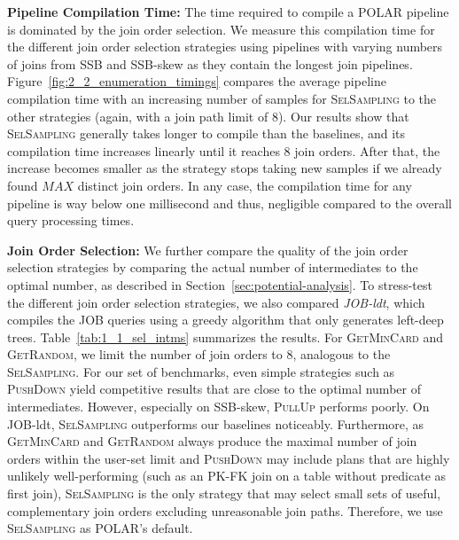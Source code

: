 \textbf{Pipeline Compilation Time:} The time required to compile a POLAR pipeline is dominated by the join order selection. We measure this compilation time for the different join order selection strategies using pipelines with varying numbers of joins from SSB and SSB-skew as they contain the longest join pipelines. Figure~\ref{fig:2_2_enumeration_timings} compares the average pipeline compilation time with an increasing number of samples for \textsc{SelSampling} to the other strategies (again, with a join path limit of 8). Our results show that \textsc{SelSampling} generally takes longer to compile than the baselines, and its compilation time increases linearly until it reaches 8 join orders. After that, the increase becomes smaller as the strategy stops taking new samples if we already found $MAX$ distinct join orders. In any case, the compilation time for any pipeline is way below one millisecond and thus, negligible compared to the overall query processing times.



\textbf{Join Order Selection:} We further compare the quality of the join order selection strategies by comparing the actual number of intermediates to the optimal number, as described in Section~\ref{sec:potential-analysis}. To stress-test the different join order selection strategies, we also compared \textit{JOB-ldt}, which compiles the JOB queries using a greedy algorithm that only generates left-deep trees. Table~\ref{tab:1_1_sel_intms} summarizes the results.
For \textsc{GetMinCard} and \textsc{GetRandom}, we limit the number of join orders to 8, analogous to the \textsc{SelSampling}. For our set of benchmarks, even simple strategies such as \textsc{PushDown} yield competitive results that are close to the optimal number of intermediates. However, especially on SSB-skew, \textsc{PullUp} performs poorly. On JOB-ldt, \textsc{SelSampling} outperforms our baselines noticeably. Furthermore, as \textsc{GetMinCard} and \textsc{GetRandom} always produce the maximal number of join orders within the user-set limit and \textsc{PushDown} may include plans that are highly unlikely well-performing (such as an PK-FK join on a table without predicate as first join), \textsc{SelSampling} is the only strategy that may select small sets of useful, complementary join orders excluding unreasonable join paths. Therefore, we use \textsc{SelSampling} as POLAR's default.


